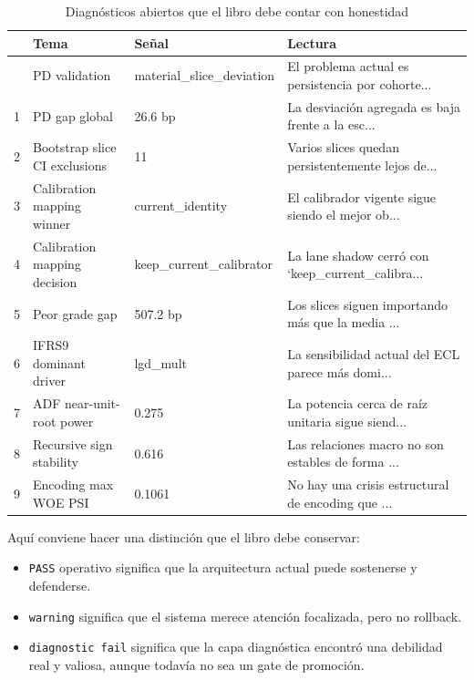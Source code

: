 \documentclass[
  spanish,
  11pt,
  letterpaper,
]{scrbook}
\providecommand{\tightlist}{%
  \setlength{\itemsep}{0pt}\setlength{\parskip}{0pt}}
\theoremstyle{plain}
\theoremstyle{remark}
\begin{document}
{

\begin{longtable}[]{@{}llll@{}}

\caption{\label{tbl-mrm-open-diagnostics}Diagnósticos abiertos que el
libro debe contar con honestidad}

\tabularnewline

\toprule\noalign{}
& Tema & Señal & Lectura \\
\midrule\noalign{}
\endhead
\bottomrule\noalign{}
\endlastfoot
0 & PD validation & material\_slice\_deviation & El problema actual es
persistencia por cohorte... \\
1 & PD gap global & 26.6 bp & La desviación agregada es baja frente a la
esc... \\
2 & Bootstrap slice CI exclusions & 11 & Varios slices quedan
persistentemente lejos de... \\
3 & Calibration mapping winner & current\_identity & El calibrador
vigente sigue siendo el mejor ob... \\
4 & Calibration mapping decision & keep\_current\_calibrator & La lane
shadow cerró con `keep\_current\_calibra... \\
5 & Peor grade gap & 507.2 bp & Los slices siguen importando más que la
media ... \\
6 & IFRS9 dominant driver & lgd\_mult & La sensibilidad actual del ECL
parece más domi... \\
7 & ADF near-unit-root power & 0.275 & La potencia cerca de raíz
unitaria sigue siend... \\
8 & Recursive sign stability & 0.616 & Las relaciones macro no son
estables de forma ... \\
9 & Encoding max WOE PSI & 0.1061 & No hay una crisis estructural de
encoding que ... \\

\end{longtable}

}

Aquí conviene hacer una distinción que el libro debe conservar:

\begin{itemize}
\tightlist
\item
  \texttt{PASS} operativo significa que la arquitectura actual puede
  sostenerse y defenderse.
\item
  \texttt{warning} significa que el sistema merece atención focalizada,
  pero no rollback.
\item
  \texttt{diagnostic\ fail} significa que la capa diagnóstica encontró
  una debilidad real y valiosa, aunque todavía no sea un gate de
  promoción.
\end{itemize}
\end{document}
